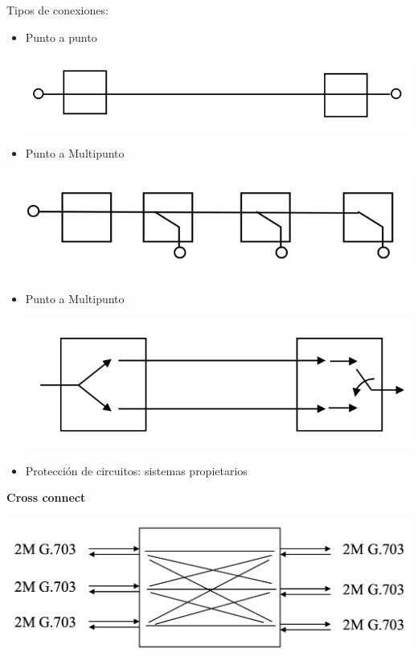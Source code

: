 \documentclass[10pt,portrait, twocolumn]{article}
\begin{document}
Tipos de conexiones:

	\begin{itemize}
	\item Punto a punto
		\begin{center}
			\includegraphics[scale=0.2]{images/P2P}
		\end{center}
	\item Punto a Multipunto
		\begin{center}
			\includegraphics[scale=0.2]{images/P2M}
		\end{center}
	\item Punto a Multipunto
		\begin{center}
			\includegraphics[scale=0.2]{images/Uni}
		\end{center}
	\item Protección de circuitos: sistemas propietarios
	\end{itemize}

\textbf{Cross connect}

	\begin{center}
			\includegraphics[scale=0.2]{images/Cross}
		\end{center}
\end{document}
